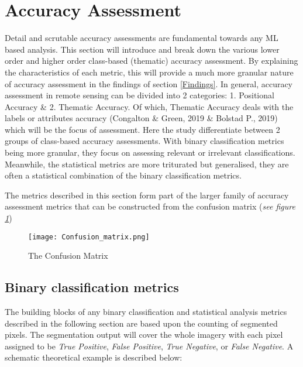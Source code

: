 \documentclass[11pt, a4paper, twoside]{report}
\begin{document}
\section{Accuracy Assessment}\label{AccAss}

Detail and scrutable accuracy assessments are fundamental towards any ML based analysis. This section will introduce and break down the various lower order and higher order class-based (thematic) accuracy assessment. By explaining the characteristics of each metric, this will provide a much more granular nature of accuracy assessment in the findings of section \ref{Findings}. In general, accuracy assessment in remote sensing can be divided into 2 categories: 1. Positional Accuracy \& 2. Thematic Accuracy. Of which, Thematic Accuracy deals with the labels or attributes accuracy (Congalton \& Green, 2019 \& Bolstad P., 2019) which will be the focus of assessment. Here the study differentiate between 2 groups of class-based accuracy assessments. With binary classification metrics being more granular, they focus on assessing relevant or irrelevant classifications. Meanwhile, the statistical metrics are more triturated but generalised, they are often a statistical combination of the binary classification metrics.\\\par

The metrics described in this section form part of the larger family of accuracy assessment metrics that can be constructed from the confusion matrix (\textit{see figure \ref{fig:cmatrix}})\\\par

\begin{figure}[H]
  \centering
  \texttt{[image: Confusion\_matrix.png]}
  \caption{The Confusion Matrix}
  \label{fig:cmatrix}
\end{figure}

\subsection{Binary classification metrics}\label{1storder}

The building blocks of any binary classification and statistical analysis metrics described in the following section are based upon the counting of segmented pixels. The segmentation output will cover the whole imagery with each pixel assigned to be \textit{True Positive}, \textit{False Positive}, \textit{True Negative}, or \textit{False Negative}. A schematic theoretical example is described below:\\\par
\end{document}
